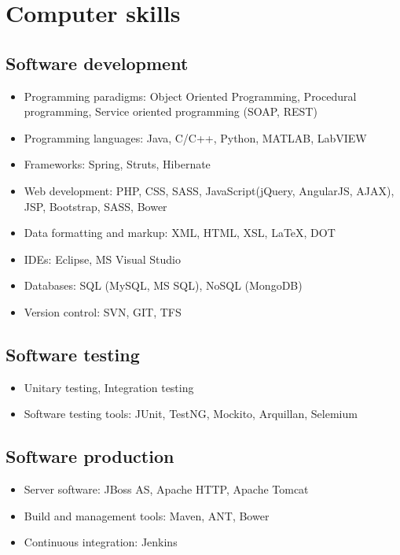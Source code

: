 \documentclass[letter,10pt]{article} %
\begin{document}

\section{Computer skills}

\subsection*{Software development}
\begin{itemize}
  \item Programming paradigms: Object Oriented Programming,
  Procedural programming, Service oriented
  programming (SOAP, REST)
  \item Programming languages: Java, C/C++, Python,
  MATLAB, LabVIEW
  \item Frameworks: Spring, Struts, Hibernate
  \item Web development: PHP, CSS, SASS, JavaScript(jQuery, AngularJS, AJAX),
  JSP, Bootstrap, SASS, Bower
  \item Data formatting and markup: XML, HTML, XSL, LaTeX, DOT
  \item IDEs: Eclipse, MS Visual Studio
  \item Databases: SQL (MySQL, MS SQL), NoSQL (MongoDB)
  \item Version control: SVN, GIT, TFS
\end{itemize}

\subsection*{Software testing} 
\begin{itemize}
\item Unitary testing, Integration testing
\item Software testing tools: JUnit, TestNG, Mockito, Arquillan, Selemium
\end{itemize}

\subsection*{Software production}
\begin{itemize} 
\item Server software: JBoss AS, Apache HTTP, Apache Tomcat
\item Build and management tools: Maven, ANT, Bower
\item Continuous integration: Jenkins
\end{itemize} 
  
\end{document}

